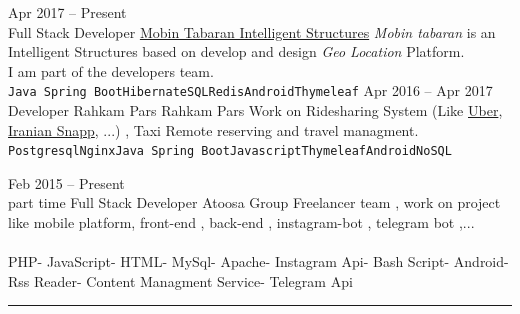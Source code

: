 \documentclass[8pt]{developercv} %
\begin{document}
\begin{entrylist}
	\entry
		{Apr 2017 -- Present\\}
		{Full Stack Developer}
		{\href{http://mobintabaran.ir}{Mobin Tabaran Intelligent Structures}}
		{\textsl{Mobin tabaran} is an Intelligent Structures based on develop and design \textit{Geo Location} Platform.\\ I am part of the developers team.\\
		\texttt{Java Spring Boot}\slashsep\texttt{Hibernate}\slashsep\texttt{SQL}\slashsep\texttt{Redis}\slashsep\texttt{Android}\slashsep\texttt{Thymeleaf}}
	\entry
		{Apr 2016 -- Apr 2017\\}
		{Developer}
		{Rahkam Pars}
		{Rahkam Pars Work on Ridesharing System (Like
		\href{https://www.uber.com/}{Uber},
		\href{https://snapp.ir/}{Iranian Snapp},
		...) , Taxi Remote reserving and travel managment.\\
		\texttt{Postgresql}\slashsep\texttt{Nginx}\slashsep\texttt{Java Spring Boot}\slashsep\texttt{Javascript}\slashsep\texttt{Thymeleaf}\slashsep\texttt{Android}\slashsep\texttt{NoSQL}
		}

	\entry
		{Feb 2015 -- Present\\\footnotesize{part time}}
		{Full Stack Developer}
		{Atoosa Group}
		{Freelancer team , work on project like mobile platform, front-end , back-end , instagram-bot , telegram bot ,...\\\\
		\scriptsize{PHP}\space\space-\space\space
		\scriptsize{JavaScript}\space\space-\space\space
		\scriptsize{HTML}\space\space-\space\space
		\scriptsize{MySql}\space\space-\space\space
		\scriptsize{Apache}\space\space-\space\space
		\scriptsize{Instagram Api}\space\space-\space\space
		\scriptsize{Bash Script}\space\space-\space\space
		\scriptsize{Android}\space\space-\space\space
		\scriptsize{Rss Reader}\space\space-\space\space
		\scriptsize{Content Managment Service}\space\space-\space\space
		\scriptsize{Telegram Api}}


\end{entrylist}

\noindent\rule{\textwidth}{1pt}

\vspace{5pt} %
\end{document}
